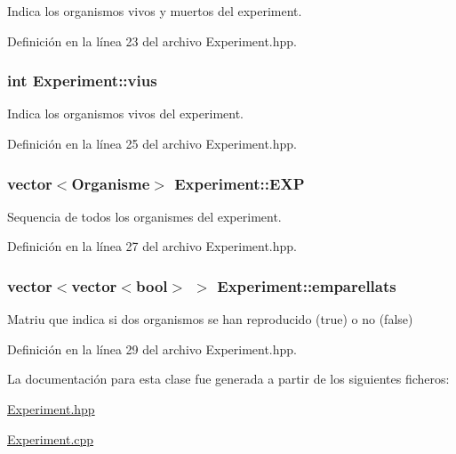 Indica los organismos vivos y muertos del experiment. 



Definición en la línea 23 del archivo Experiment.\-hpp.

\hypertarget{class_experiment_a6d9c9be557f9df1d3162494c2b305ba0}{
\subsubsection[{vius}]{\setlength{\rightskip}{0pt plus 5cm}int Experiment\-::vius\hspace{0.3cm}{\ttfamily [private]}}}\label{class_experiment_a6d9c9be557f9df1d3162494c2b305ba0}


Indica los organismos vivos del experiment. 



Definición en la línea 25 del archivo Experiment.\-hpp.

\hypertarget{class_experiment_a2d3539cb5f6996e83a7d687538411501}{
\subsubsection[{E\-X\-P}]{\setlength{\rightskip}{0pt plus 5cm}vector$<${\bf Organisme}$>$ Experiment\-::\-E\-X\-P\hspace{0.3cm}{\ttfamily [private]}}}\label{class_experiment_a2d3539cb5f6996e83a7d687538411501}


Sequencia de todos los organismes del experiment. 



Definición en la línea 27 del archivo Experiment.\-hpp.

\hypertarget{class_experiment_a34a18593817af15f21bf185369081b5c}{
\subsubsection[{emparellats}]{\setlength{\rightskip}{0pt plus 5cm}vector$<$vector$<$bool$>$ $>$ Experiment\-::emparellats\hspace{0.3cm}{\ttfamily [private]}}}\label{class_experiment_a34a18593817af15f21bf185369081b5c}


Matriu que indica si dos organismos se han reproducido (true) o no (false) 



Definición en la línea 29 del archivo Experiment.\-hpp.



La documentación para esta clase fue generada a partir de los siguientes ficheros\-:\begin{DoxyCompactItemize}
\item 
\hyperlink{_experiment_8hpp}{Experiment.\-hpp}\item 
\hyperlink{_experiment_8cpp}{Experiment.\-cpp}\end{DoxyCompactItemize}
